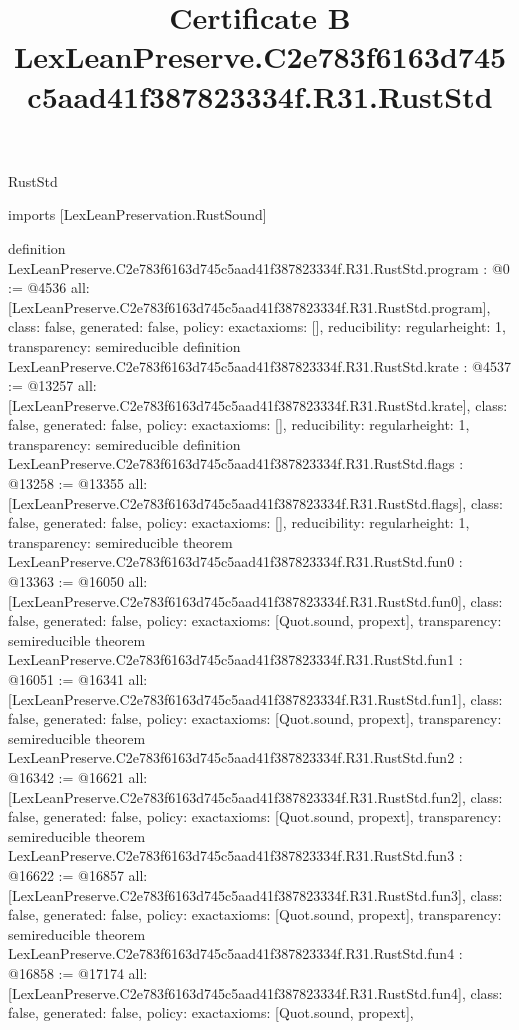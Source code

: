 \begin{lexlean}{RustStd}
\title{Certificate B LexLeanPreserve.C2e783f6163d745c5aad41f387823334f.R31.RustStd}
\begin{coremodule}
imports [LexLeanPreservation.RustSound]

definition LexLeanPreserve.C2e783f6163d745c5aad41f387823334f.R31.RustStd.program : @0 := @4536 {
  all: [LexLeanPreserve.C2e783f6163d745c5aad41f387823334f.R31.RustStd.program],
  class: false,
  generated: false,
  policy: exact{axioms: []},
  reducibility: regular{height: 1},
  transparency: semireducible
}
definition LexLeanPreserve.C2e783f6163d745c5aad41f387823334f.R31.RustStd.krate : @4537 := @13257 {
  all: [LexLeanPreserve.C2e783f6163d745c5aad41f387823334f.R31.RustStd.krate],
  class: false,
  generated: false,
  policy: exact{axioms: []},
  reducibility: regular{height: 1},
  transparency: semireducible
}
definition LexLeanPreserve.C2e783f6163d745c5aad41f387823334f.R31.RustStd.flags : @13258 := @13355 {
  all: [LexLeanPreserve.C2e783f6163d745c5aad41f387823334f.R31.RustStd.flags],
  class: false,
  generated: false,
  policy: exact{axioms: []},
  reducibility: regular{height: 1},
  transparency: semireducible
}
theorem LexLeanPreserve.C2e783f6163d745c5aad41f387823334f.R31.RustStd.fun0 : @13363 := @16050 {
  all: [LexLeanPreserve.C2e783f6163d745c5aad41f387823334f.R31.RustStd.fun0],
  class: false,
  generated: false,
  policy: exact{axioms: [Quot.sound, propext]},
  transparency: semireducible
}
theorem LexLeanPreserve.C2e783f6163d745c5aad41f387823334f.R31.RustStd.fun1 : @16051 := @16341 {
  all: [LexLeanPreserve.C2e783f6163d745c5aad41f387823334f.R31.RustStd.fun1],
  class: false,
  generated: false,
  policy: exact{axioms: [Quot.sound, propext]},
  transparency: semireducible
}
theorem LexLeanPreserve.C2e783f6163d745c5aad41f387823334f.R31.RustStd.fun2 : @16342 := @16621 {
  all: [LexLeanPreserve.C2e783f6163d745c5aad41f387823334f.R31.RustStd.fun2],
  class: false,
  generated: false,
  policy: exact{axioms: [Quot.sound, propext]},
  transparency: semireducible
}
theorem LexLeanPreserve.C2e783f6163d745c5aad41f387823334f.R31.RustStd.fun3 : @16622 := @16857 {
  all: [LexLeanPreserve.C2e783f6163d745c5aad41f387823334f.R31.RustStd.fun3],
  class: false,
  generated: false,
  policy: exact{axioms: [Quot.sound, propext]},
  transparency: semireducible
}
theorem LexLeanPreserve.C2e783f6163d745c5aad41f387823334f.R31.RustStd.fun4 : @16858 := @17174 {
  all: [LexLeanPreserve.C2e783f6163d745c5aad41f387823334f.R31.RustStd.fun4],
  class: false,
  generated: false,
  policy: exact{axioms: [Quot.sound, propext]},
}
\end{coremodule}
\end{lexlean}

